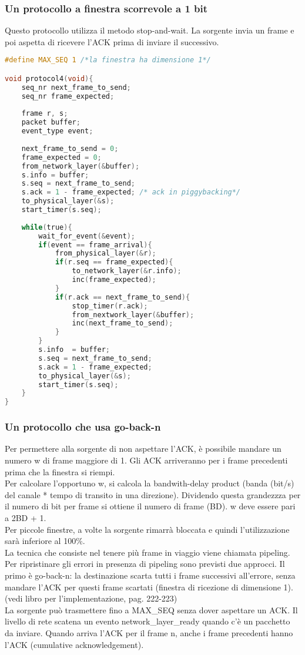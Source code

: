 \documentclass{article}
\begin{document}
\subsubsection{Un protocollo a finestra scorrevole a 1 bit}
Questo protocollo utilizza il metodo stop-and-wait. La sorgente invia un frame e poi aspetta di ricevere l'ACK prima di inviare il successivo.\\
\begin{lstlisting}[language=C, caption=protocollo a finestra scorrevole a 1 bit]
#define MAX_SEQ 1 /*la finestra ha dimensione 1*/

void protocol4(void){
	seq_nr next_frame_to_send;	
	seq_nr frame_expected;
	
	frame r, s;
	packet buffer;
	event_type event;
	
	next_frame_to_send = 0;
	frame_expected = 0;
	from_network_layer(&buffer);
	s.info = buffer;
	s.seq = next_frame_to_send;
	s.ack = 1 - frame_expected; /* ack in piggybacking*/
	to_physical_layer(&s);
	start_timer(s.seq);
	
	while(true){
		wait_for_event(&event);
		if(event == frame_arrival){
			from_physical_layer(&r);
			if(r.seq == frame_expected){
				to_network_layer(&r.info);
				inc(frame_expected);
			}
			if(r.ack == next_frame_to_send){
				stop_timer(r.ack);
				from_nextwork_layer(&buffer);
				inc(next_frame_to_send);
			}
		}
		s.info  = buffer;
		s.seq = next_frame_to_send;
		s.ack = 1 - frame_expected;
		to_physical_layer(&s);
		start_timer(s.seq);
	}
}
\end{lstlisting}


\subsubsection{Un protocollo che usa go-back-n}
Per permettere alla sorgente di non aspettare l'ACK, è possibile mandare un numero w di frame maggiore di 1. Gli ACK arriveranno per i frame precedenti prima che la finestra si riempi. \\
Per calcolare l'opportuno w, si calcola la bandwith-delay product (banda (bit/s) del canale * tempo di transito in una direzione). Dividendo questa grandezzza per il numero di bit per frame si ottiene il numero di frame (BD). w deve essere pari a 2BD + 1.\\
Per piccole finestre, a volte la sorgente rimarrà bloccata e quindi l'utilizzazione sarà inferiore al 100$\%$.\\
La tecnica che consiste nel tenere più frame in viaggio viene chiamata pipeling.
Per ripristinare gli errori in presenza di pipeling sono previsti due approcci.
Il primo è go-back-n: la destinazione scarta tutti i frame successivi all'errore, senza mandare l'ACK per questi frame scartati (finestra di ricezione di dimensione 1).\\
(vedi libro per l'implementazione, pag. 222-223)\\
La sorgente può trasmettere fino a MAX\_SEQ senza dover aspettare un ACK. Il livello di rete scatena un evento network\_layer\_ready quando c'è un pacchetto da inviare. Quando arriva l'ACK per il frame n, anche i frame precedenti hanno l'ACK (cumulative acknowledgement). 
\end{document}
